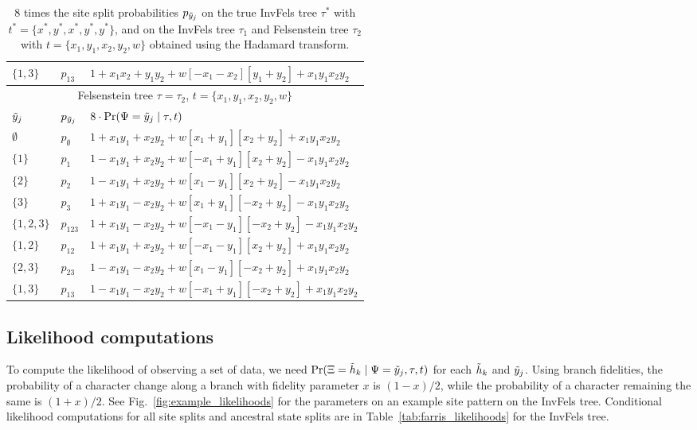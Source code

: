 \begin{table}[ht]
\begin{tabular}{|l|l|l|}
    $\{1,3\}$   & $p_{13}$          &$1 + x_1x_2 +  y_1y_2 +  w[- x_1 - x_2][  y_1 + y_2] + x_1y_1x_2y_2$\\
    \hline
    \multicolumn{3}{c}{Felsenstein tree $\tau=\tau_2$, $t=\{x_1,y_1,x_2,y_2,w\}$}\\
    \hline
$\tilde{y}_j$  & $p_{\tilde{y}_j}$ &$8\cdot\Pr(\Psi=\tilde{y}_j \mid \tau,t)$\\
    \hline
    $\emptyset$ & $p_{\emptyset}$   &$1 + x_1y_1 +  x_2y_2 +  w[  x_1 + y_1][  x_2 + y_2] + x_1y_1x_2y_2$\\
    $\{1\}$     & $p_{1}$           &$1 - x_1y_1 +  x_2y_2 +  w[ -x_1 + y_1][  x_2 + y_2] - x_1y_1x_2y_2$\\
    $\{2\}$     & $p_{2}$           &$1 - x_1y_1 +  x_2y_2 +  w[  x_1 - y_1][  x_2 + y_2] - x_1y_1x_2y_2$\\
    $\{3\}$     & $p_{3}$           &$1 + x_1y_1 -  x_2y_2 +  w[  x_1 + y_1][ -x_2 + y_2] - x_1y_1x_2y_2$\\
    $\{1,2,3\}$ & $p_{123}$         &$1 + x_1y_1 -  x_2y_2 +  w[ -x_1 - y_1][ -x_2 + y_2] - x_1y_1x_2y_2$\\
    $\{1,2\}$   & $p_{12}$          &$1 + x_1y_1 +  x_2y_2 +  w[ -x_1 - y_1][  x_2 + y_2] + x_1y_1x_2y_2$\\
    $\{2,3\}$   & $p_{23}$          &$1 - x_1y_1 -  x_2y_2 +  w[  x_1 - y_1][ -x_2 + y_2] + x_1y_1x_2y_2$\\
    $\{1,3\}$   & $p_{13}$          &$1 - x_1y_1 -  x_2y_2 +  w[ -x_1 + y_1][ -x_2 + y_2] + x_1y_1x_2y_2$\\
    \hline
\end{tabular}
\caption{8 times the site split probabilities $p_{\tilde{y}_j}$ on the true InvFels tree $\tau^*$ with $t^*=\{x^*,y^*,x^*,y^*,y^*\}$, and on the InvFels tree $\tau_1$ and Felsenstein tree $\tau_2$ with $t=\{x_1,y_1,x_2,y_2,w\}$ obtained using the Hadamard transform.
}
\label{tab:gen-sitepatprob}
\end{table}

\subsection*{Likelihood computations}

To compute the likelihood of observing a set of data, we need $\Pr(\Xi=\tilde{h}_k \mid \Psi=\tilde{y}_j, \tau, t)$ for each $\tilde{h}_k$ and $\tilde{y}_j$.
Using branch fidelities, the probability of a character change along a branch with fidelity parameter $x$ is $(1-x)/2$, while the probability of a character remaining the same is $(1+x)/2$.
See Fig.~\ref{fig:example_likelihoods} for the parameters on an example site pattern on the InvFels tree.
Conditional likelihood computations for all site splits and ancestral state splits are in Table~\ref{tab:farris_likelihoods} for the InvFels tree.

